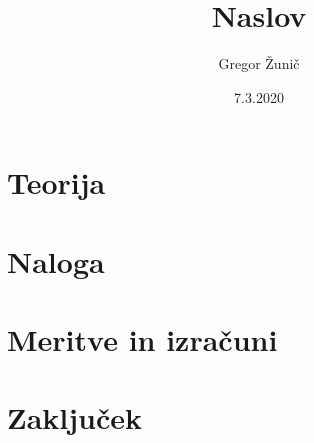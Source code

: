 \documentclass[12pt,a4paper]{article}
\title{\bf{Naslov}}
\author{Gregor Žunič}
\date{7.3.2020}
\begin{document}
\maketitle
\newpage

\newpage
\section{Teorija}
\label{sec: teorija}


\section{Naloga}
\label{sec: naloga}



\section{Meritve in izračuni}
\label{sec: meritve}


\section{Zaključek}
\end{document}
